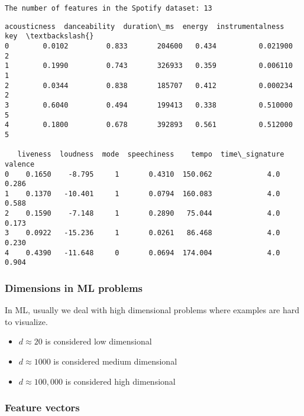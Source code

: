 \documentclass[11pt]{article}
\makeatletter
\providecommand{\tightlist}{%
      \setlength{\itemsep}{0pt}\setlength{\parskip}{0pt}}
\newcommand{\boxspacing}{\kern\kvtcb@left@rule\kern\kvtcb@boxsep}
\newcommand{\prompt}[4]{
        {\ttfamily\llap{{\color{#2}[#3]:\hspace{3pt}#4}}\vspace{-\baselineskip}}
    }
\makeatother
\begin{document}
    \begin{Verbatim}[commandchars=\\\{\}]
The number of features in the Spotify dataset: 13
    \end{Verbatim}

            \begin{tcolorbox}[breakable, size=fbox, boxrule=.5pt, pad at break*=1mm, opacityfill=0]
\prompt{Out}{outcolor}{8}{\boxspacing}
\begin{Verbatim}[commandchars=\\\{\}]
   acousticness  danceability  duration\_ms  energy  instrumentalness  key  \textbackslash{}
0        0.0102         0.833       204600   0.434          0.021900    2
1        0.1990         0.743       326933   0.359          0.006110    1
2        0.0344         0.838       185707   0.412          0.000234    2
3        0.6040         0.494       199413   0.338          0.510000    5
4        0.1800         0.678       392893   0.561          0.512000    5

   liveness  loudness  mode  speechiness    tempo  time\_signature  valence
0    0.1650    -8.795     1       0.4310  150.062             4.0    0.286
1    0.1370   -10.401     1       0.0794  160.083             4.0    0.588
2    0.1590    -7.148     1       0.2890   75.044             4.0    0.173
3    0.0922   -15.236     1       0.0261   86.468             4.0    0.230
4    0.4390   -11.648     0       0.0694  174.004             4.0    0.904
\end{Verbatim}
\end{tcolorbox}
        
    \subsubsection{Dimensions in ML
problems}\label{dimensions-in-ml-problems}

In ML, usually we deal with high dimensional problems where examples are
hard to visualize.

\begin{itemize}
\tightlist
\item
  \(d \approx 20\) is considered low dimensional
\item
  \(d \approx 1000\) is considered medium dimensional
\item
  \(d \approx 100,000\) is considered high dimensional
\end{itemize}

    \subsubsection{Feature vectors}\label{feature-vectors}
\end{document}
